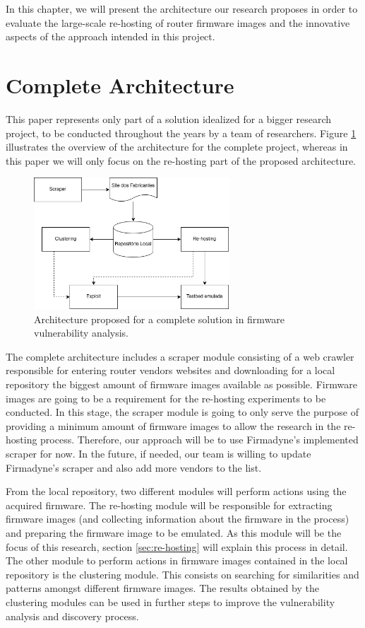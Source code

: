 In this chapter, we will present the architecture our research proposes in order to evaluate the large-scale re-hosting of router firmware images and the innovative aspects of the approach intended in this project.

\section{Complete Architecture}
This paper represents only part of a solution idealized for a bigger research project, to be conducted throughout the years by a team of researchers. Figure \ref{fig:architecture} illustrates the overview of the architecture for the complete project, whereas in this paper we will only focus on the re-hosting part of the proposed architecture.

\begin{figure}[h]
    \centering
    \includegraphics[width=0.65\textwidth]{figs/RehostingDiagram.png}
    \caption{Architecture proposed for a complete solution in firmware vulnerability analysis.}
    \label{fig:architecture}
\end{figure}

The complete architecture includes a scraper module consisting of a web crawler responsible for entering router vendors websites and downloading for a local repository the biggest amount of firmware images available as possible. Firmware images are going to be a requirement for the re-hosting experiments to be conducted. In this stage, the scraper module is going to only serve the purpose of providing a minimum amount of firmware images to allow the research in the re-hosting process. Therefore, our approach will be to use Firmadyne's \cite{firmadyne} implemented scraper for now. In the future, if needed, our team is willing to update Firmadyne's \cite{firmadyne} scraper and also add more vendors to the list.

From the local repository, two different modules will perform actions using the acquired firmware. The re-hosting module will be responsible for extracting firmware images (and collecting information about the firmware in the process) and preparing the firmware image to be emulated. As this module will be the focus of this research, section \ref{sec:re-hosting} will explain this process in detail. The other module to perform actions in firmware images contained in the local repository is the clustering module. This consists on searching for similarities and patterns amongst different firmware images. The results obtained by the clustering modules can be used in further steps to improve the vulnerability analysis and discovery process.

